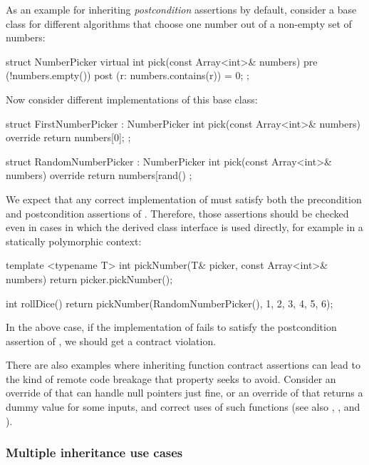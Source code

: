 As an example for inheriting \emph{postcondition} assertions by default, consider a base class for different algorithms that choose one number out of a non-empty set of numbers:
\begin{codeblock}
struct NumberPicker {
  virtual int pick(const Array<int>& numbers)
    pre (!numbers.empty())
    post (r: numbers.contains(r)) = 0;
};
\end{codeblock}
Now consider different implementations of this base class:
\begin{codeblock}
struct FirstNumberPicker : NumberPicker {
  int pick(const Array<int>& numbers) override {
    return numbers[0];
  }
};

struct RandomNumberPicker : NumberPicker {
  int pick(const Array<int>& numbers) override {
    return numbers[rand() %
  }
};
\end{codeblock}
We expect that any correct implementation of   must satisfy both the precondition and postcondition assertions of . Therefore, those assertions should be checked even in cases in which the derived class interface is used directly, for example in a statically polymorphic context:
\begin{codeblock}
template <typename T>
int pickNumber(T& picker, const Array<int>& numbers) {
  return picker.pickNumber();
}

int rollDice() {
  return pickNumber(RandomNumberPicker(), {1, 2, 3, 4, 5, 6});
}
\end{codeblock}
In the above case, if the implementation of  fails to satisfy the postcondition assertion of , we should get a contract violation.

There are also examples where inheriting function contract assertions can lead to the kind of remote code breakage that property  seeks to avoid. Consider an override of \allowbreak{}  that can handle null pointers just fine, or an override of \allowbreak{} that returns a dummy value for some inputs, and correct uses of such functions (see also , , and ). 

\subsubsection{Multiple inheritance use cases}


